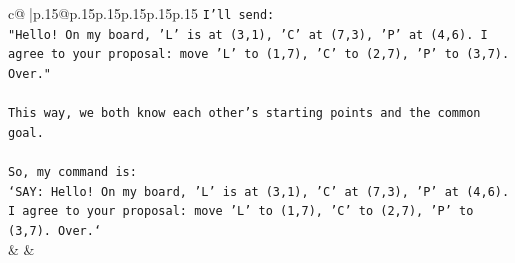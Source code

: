 \documentclass{article}
\begin{document}
{\begin{supertabular}{c@{$\;$}|p{.15\linewidth}@{}p{.15\linewidth}p{.15\linewidth}p{.15\linewidth}p{.15\linewidth}p{.15\linewidth}}
{{{\texttt{I'll send:} \\
\texttt{"Hello! On my board, 'L' is at (3,1), 'C' at (7,3), 'P' at (4,6). I agree to your proposal: move 'L' to (1,7), 'C' to (2,7), 'P' to (3,7). Over."} \\
\\ 
\texttt{This way, we both know each other's starting points and the common goal.} \\
\\ 
\texttt{So, my command is:} \\
\texttt{`SAY: Hello! On my board, 'L' is at (3,1), 'C' at (7,3), 'P' at (4,6). I agree to your proposal: move 'L' to (1,7), 'C' to (2,7), 'P' to (3,7). Over.`} \\
            }
        }
    }
    & & \\ \\


\end{supertabular}}
\end{document}
